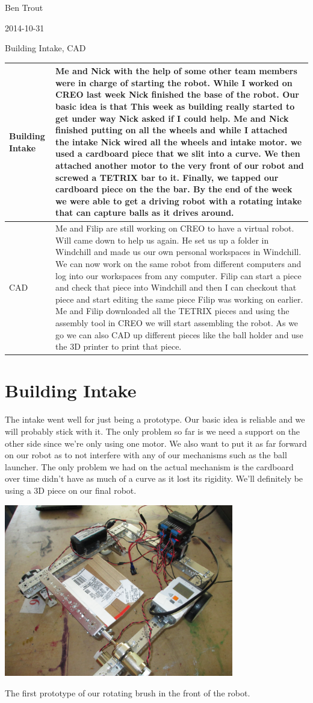 Ben Trout

2014-10-31

Building Intake, CAD

\begin{tabular}{|p{5cm}|p{5cm}|}
\hline
 Building Intake&
Me and Nick with the help of some other team members were in charge of starting the robot. While I worked on CREO last week Nick finished the base of the robot. Our basic idea is  that This week as building really started to get under way Nick asked if I could help. Me and Nick finished putting on all the wheels and while I attached the intake Nick wired all the wheels and intake motor. we used a cardboard piece that we slit into a curve. We then attached another motor to the very front of our robot and screwed a TETRIX bar to it. Finally, we tapped our cardboard piece on the the bar. By the end of the week we were able to get a driving robot with a rotating intake that can capture balls as it drives around. 
\\
\hline
 CAD&
Me and Filip are still working on CREO to have a virtual robot. Will came down to help us again. He set us up a folder in Windchill and made us our own personal workspaces in Windchill. We can now work on the same robot from different computers and log into our workspaces from any computer. Filip can start a piece and check that piece into Windchill and then I can checkout that piece and start editing the same piece Filip was working on earlier. Me and Filip downloaded all the TETRIX pieces and using the assembly tool in CREO we will start assembling the robot. As we go we can also CAD up different pieces like the ball holder and use the 3D printer to print that piece. 
\\
\hline
\end{tabular}

\section*{Building Intake}
The intake went well for just being a prototype. Our basic idea is reliable and we will probably stick with it. The only problem so far is we need a support on the other side since we’re only using one motor. We also want to put it as far forward on our robot as to not interfere with any of our mechanisms such as the ball launcher. The only problem we had on the actual mechanism is the cardboard over time didn’t have as much of a curve as it lost its rigidity. We’ll definitely be using a 3D piece on our final robot. 


\begin{center}
\includegraphics[width=10cm]{./Entries/Images/FirstRotatingBrushProto.jpg}
\end{center}

The first prototype of our rotating brush in the front of the robot. 
